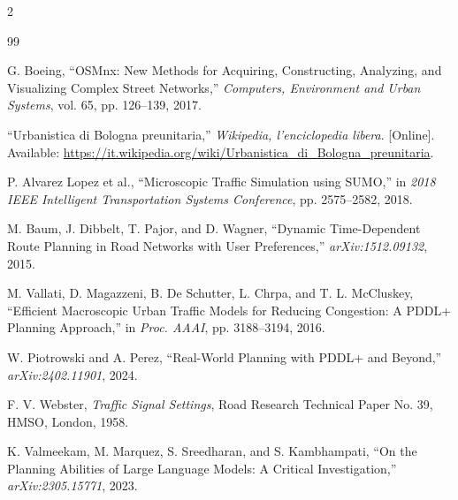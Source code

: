 \documentclass[10pt]{article}
\begin{document}
\begin{multicols}{2}
\begin{thebibliography}{99}\scriptsize

G. Boeing, ``OSMnx: New Methods for Acquiring, Constructing, Analyzing, and
Visualizing Complex Street Networks,'' \emph{Computers, Environment and Urban
Systems}, vol. 65, pp. 126--139, 2017.

``Urbanistica di Bologna preunitaria,'' \emph{Wikipedia, l'enciclopedia libera}.
[Online]. Available: \url{https://it.wikipedia.org/wiki/Urbanistica_di_Bologna_preunitaria}.

P. Alvarez Lopez et al., ``Microscopic Traffic Simulation using SUMO,'' in
\emph{2018 IEEE Intelligent Transportation Systems Conference},
pp. 2575--2582, 2018.

M. Baum, J. Dibbelt, T. Pajor, and D. Wagner, ``Dynamic Time-Dependent Route
Planning in Road Networks with User Preferences,'' \emph{arXiv:1512.09132},
2015.

M. Vallati, D. Magazzeni, B. De Schutter, L. Chrpa, and T. L. McCluskey,
``Efficient Macroscopic Urban Traffic Models for Reducing Congestion: A PDDL+
Planning Approach,'' in \emph{Proc. AAAI}, pp. 3188--3194, 2016.

W. Piotrowski and A. Perez, ``Real-World Planning with PDDL+ and Beyond,''
\emph{arXiv:2402.11901}, 2024.

F. V. Webster, \emph{Traffic Signal Settings}, Road Research Technical Paper
No. 39, HMSO, London, 1958.


K. Valmeekam, M. Marquez, S. Sreedharan, and S. Kambhampati, ``On the
Planning Abilities of Large Language Models: A Critical Investigation,''
\emph{arXiv:2305.15771}, 2023.

\end{thebibliography}
\end{multicols}
\end{document}
